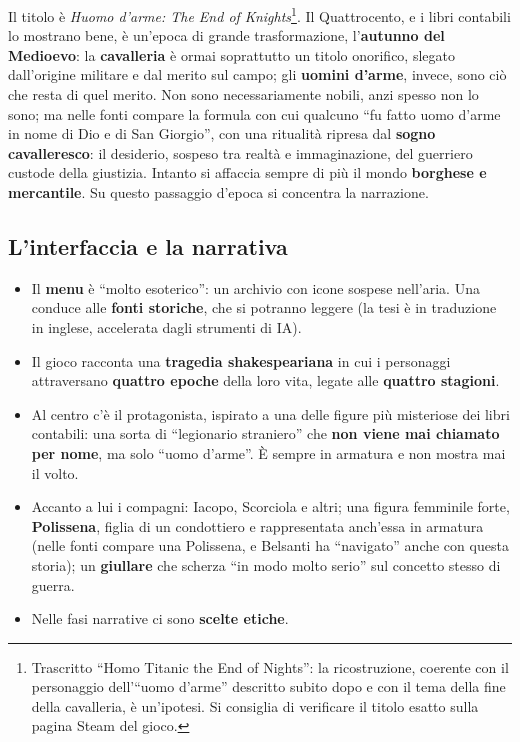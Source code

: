 Il titolo è \emph{Huomo d'arme: The End of Knights}\footnote{Trascritto ``Homo
Titanic the End of Nights'': la ricostruzione, coerente con il personaggio
dell'``uomo d'arme'' descritto subito dopo e con il tema della fine della
cavalleria, è un'ipotesi. Si consiglia di verificare il titolo esatto sulla
pagina Steam del gioco.}. Il Quattrocento, e i libri contabili lo mostrano bene,
è un'epoca di grande trasformazione, l'\textbf{autunno del Medioevo}: la
\textbf{cavalleria} è ormai soprattutto un titolo onorifico, slegato dall'origine
militare e dal merito sul campo; gli \textbf{uomini d'arme}, invece, sono ciò
che resta di quel merito. Non sono necessariamente nobili, anzi spesso non lo
sono; ma nelle fonti compare la formula con cui qualcuno ``fu fatto uomo d'arme
in nome di Dio e di San Giorgio'', con una ritualità ripresa dal
\textbf{sogno cavalleresco}: il desiderio, sospeso tra realtà e immaginazione,
del guerriero custode della giustizia. Intanto si affaccia sempre di più il
mondo \textbf{borghese e mercantile}. Su questo passaggio d'epoca si concentra
la narrazione.

\subsection{L'interfaccia e la narrativa}

\begin{itemize}
  \item Il \textbf{menu} è ``molto esoterico'': un archivio con icone sospese
        nell'aria. Una conduce alle \textbf{fonti storiche}, che si potranno
        leggere (la tesi è in traduzione in inglese, accelerata dagli strumenti
        di IA).
  \item Il gioco racconta una \textbf{tragedia shakespeariana} in cui i
        personaggi attraversano \textbf{quattro epoche} della loro vita, legate
        alle \textbf{quattro stagioni}.
  \item Al centro c'è il protagonista, ispirato a una delle figure più
        misteriose dei libri contabili: una sorta di ``legionario straniero''
        che \textbf{non viene mai chiamato per nome}, ma solo ``uomo d'arme''.
        È sempre in armatura e non mostra mai il volto.
  \item Accanto a lui i compagni: Iacopo, Scorciola e altri; una figura
        femminile forte, \textbf{Polissena}, figlia di un condottiero e
        rappresentata anch'essa in armatura (nelle fonti compare una Polissena,
        e Belsanti ha ``navigato'' anche con questa storia); un
        \textbf{giullare} che scherza ``in modo molto serio'' sul concetto
        stesso di guerra.
  \item Nelle fasi narrative ci sono \textbf{scelte etiche}.
\end{itemize}

